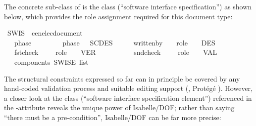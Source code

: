 \begin{isabellebody}
\begin{isamarkuptext}
The concrete sub-class of   is the class 
(``software interface specification'') as shown below, 
which provides the role assignment required for this document type: 

\begin{isarbox}

\begin{isabelle}
\isanewline
\isanewline
{}\ SWIS\ {\isacharequal}{\kern0pt}\ cenelec{\isacharunderscore}{\kern0pt}document\ {\isacharplus}{\kern0pt}\ %
\ \isanewline
\ \ \ phase\ \ \ \ \ \ \ \ {\isacharcolon}{\kern0pt}{\isacharcolon}{\kern0pt}\ {\isachardoublequoteopen}phase{\isachardoublequoteclose}\ \ {\isacharless}{\kern0pt}{\isacharequal}{\kern0pt}\ {\isachardoublequoteopen}SCDES{\isachardoublequoteclose}\ \ \ \ \ \ written{\isacharunderscore}{\kern0pt}by\ \ \ {\isacharcolon}{\kern0pt}{\isacharcolon}{\kern0pt}\ {\isachardoublequoteopen}role{\isachardoublequoteclose}\ \ \ {\isacharless}{\kern0pt}{\isacharequal}{\kern0pt}\ {\isachardoublequoteopen}DES{\isachardoublequoteclose}\isanewline
\ \ \ fst{\isacharunderscore}{\kern0pt}check\ \ \ \ {\isacharcolon}{\kern0pt}{\isacharcolon}{\kern0pt}\ {\isachardoublequoteopen}role{\isachardoublequoteclose}\ \ \ {\isacharless}{\kern0pt}{\isacharequal}{\kern0pt}\ {\isachardoublequoteopen}VER{\isachardoublequoteclose}\ \ \ \ \ \ \ \ \ \ \ snd{\isacharunderscore}{\kern0pt}check\ \ \ \ {\isacharcolon}{\kern0pt}{\isacharcolon}{\kern0pt}\ {\isachardoublequoteopen}role{\isachardoublequoteclose}\ \ \ {\isacharless}{\kern0pt}{\isacharequal}{\kern0pt}\ {\isachardoublequoteopen}VAL{\isachardoublequoteclose}\isanewline
\ \ \ components{\isacharcolon}{\kern0pt}{\isacharcolon}{\kern0pt}\ {\isachardoublequoteopen}SWIS{\isacharunderscore}{\kern0pt}E\ list{\isachardoublequoteclose}
\end{isabelle}
\end{isarbox} 
The structural constraints expressed so far can in principle be covered by any 
hand-coded validation process and suitable editing support (\eg,  Protégé \cite{protege}). 
However, a closer look at the class  (``software interface specification 
element'') referenced in the -attribute reveals the unique power of Isabelle/DOF;
rather than saying ``there must be a pre-condition'', Isabelle/DOF can be far more precise:


\end{isamarkuptext}
\end{isabellebody}
